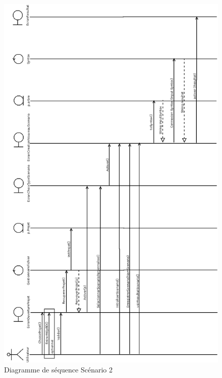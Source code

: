\documentclass[12pt]{report}
\begin{document}
\begin{figure}[h!]
\begin{center}
\includegraphics[scale=0.34]{DiagSeq2.png}
\caption{Diagramme de séquence Scénario 2}
\end{center}
\end{figure}
\end{document}
